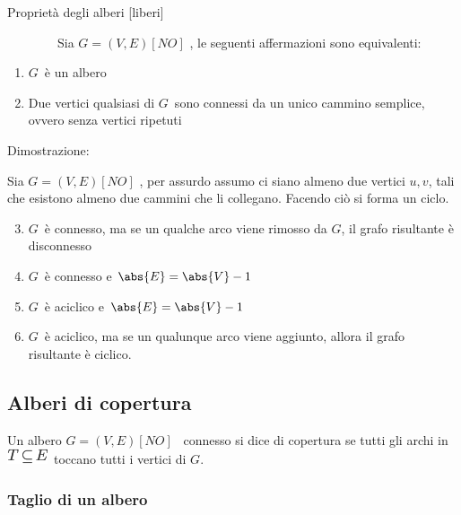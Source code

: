 \documentclass{article}
\providecommand{\tightlist}{%
  \setlength{\itemsep}{0pt}\setlength{\parskip}{0pt}}
\begin{document}
{}

{}

{Proprietà degli alberi {[}liberi{]}}

{~~~~~~~~Sia }$G=(V,E) [NO]$ {, le seguenti
affermazioni sono equivalenti:}

\begin{enumerate}
\tightlist
\item
  $G${~è un albero}
\item
  {Due vertici qualsiasi di }$G${~sono
  connessi da un unico cammino semplice, ovvero senza vertici ripetuti}
\end{enumerate}

{}

{Dimostrazione}{:~~~~~~~~}

{Sia }$G=(V,E) [NO]$ {, per assurdo assumo ci
siano almeno due vertici $u,v$, tali
che esistono almeno due cammini che li collegano. Facendo ciò si forma
un ciclo.}

\begin{enumerate}
\setcounter{enumi}{2}
\tightlist
\item
  $G${~è connesso, ma se un qualche
  arco viene rimosso da }$G${, il
  grafo risultante è disconnesso}
\item
  $G${~è connesso e $\abs{E}=\abs{V}-1$}
\item
  $G${~è aciclico e $\abs{E}=\abs{V}-1$}
\item
  $G${~è aciclico, ma se un qualunque
  arco viene aggiunto, allora il grafo risultante è ciclico.}
\end{enumerate}

{}

\hypertarget{h.9btor4ygb1hb}{\subsection{\texorpdfstring{{Alberi di
copertura}}{Alberi di copertura}}\label{h.9btor4ygb1hb}}

{Un albero }$G=(V,E) [NO]$ {~connesso si dice di
copertura se tutti gli archi in
}\includegraphics{images/image443.png}{~toccano tutti i vertici di
}$G${.}

\hypertarget{h.rdrr6bsx8ypo}{\subsubsection{\texorpdfstring{{Taglio di
un albero}}{Taglio di un albero}}\label{h.rdrr6bsx8ypo}}
\end{document}
